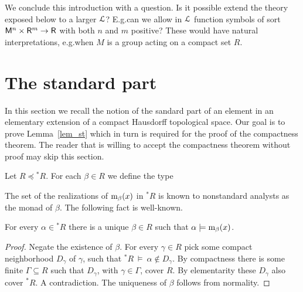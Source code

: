 \documentclass[10pt,oneside]{amsproc}
\renewcommand*{\emph}[1]{%
   \smash{\tikz[baseline]\node[rectangle, fill=teal!25, rounded corners, inner xsep=0.5ex, inner ysep=0.2ex, anchor=base, minimum height = 2.7ex]{#1};}}
\begin{document}
We conclude this introduction with a question.
Is it possible extend the theory exposed below to a larger ${\EuScript L}$?
E.g.\@ can we allow in ${\EuScript L}$ function symbols of sort ${\sf M}^n\times {\sf R}^m\to {\sf R}$ with both $n$ and $m$ positive?
These would have natural interpretations, e.g.\@ when $M$ is a group acting on a compact set $R$.

\section{The standard part}\label{standard_part}

In this section we recall the notion of the sandard part of an element in an elementary extension of a compact Hausdorff topological space.
Our goal is to prove Lemma~\ref{lem_st} which in turn is required for the proof of the compactness theorem.
The reader that is willing to accept the compactness theorem without proof may skip this section.


Let $R\preceq{}^*\!R$.
For each $\beta\in R$ we define the type


The set of the realizations of ${\rm m}_\beta(x)$ in ${}^*\!R$ is known to nonstandard analysts as the monad of $\beta$. 
The following fact is well-known.

\begin{fact}\label{fact_uniqueness_st}
  For every $\alpha\in{}^*\!R$ there is a unique $\beta\in R$ such that $\alpha\models{\rm m}_\beta(x)$.
\end{fact}

\begin{proof}
  Negate the existence of $\beta$.
  For every $\gamma\in R$ pick some compact neighborhood $D_\gamma$ of $\gamma$, such that ${}^*\!R\ \models\ \alpha\notin D_\gamma$.
  By compactness there is some finite $\Gamma\subseteq R$ such that $D_\gamma$, with $\gamma\in\Gamma$, cover $R$.
  By elementarity these $D_{\gamma}$ also cover ${}^*\!R$.
  A contradiction.
  The uniqueness of $\beta$ follows from normality.
\end{proof}
\end{document}
